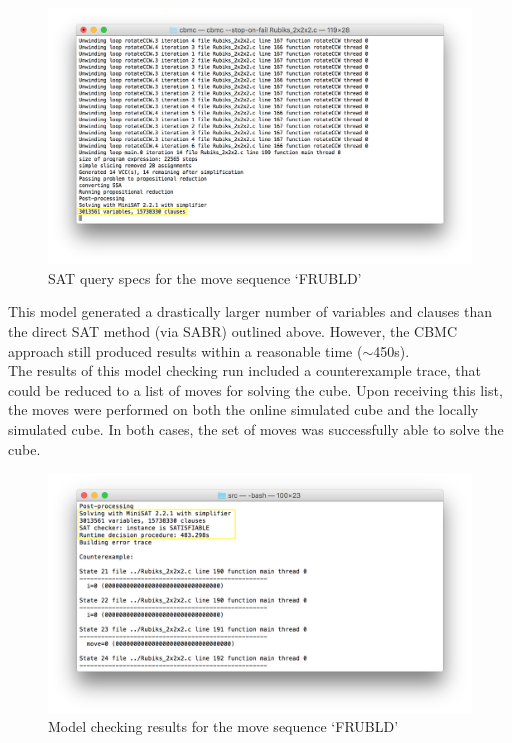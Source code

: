 \documentclass{article}
\begin{document}
\begin{figure}[h]
\includegraphics[width=\textwidth]{pics/2x2x2_SAT_Query_Specs.png}
\caption{SAT query specs for the move sequence `FRUBLD'}
\end{figure}

\noindent This model generated a drastically larger number of variables and clauses than the direct SAT method (via SABR) outlined above. However, the CBMC approach still produced results within a reasonable time ($\sim$450s).\\

\noindent The results of this model checking run included a counterexample trace, that could be reduced to a list of moves for solving the cube. Upon receiving this list, the moves were performed on both the online simulated cube and the locally simulated cube. In both cases, the set of moves was successfully able to solve the cube.

\begin{figure}[h]
\includegraphics[width=\textwidth]{pics/2x2x2_Successful_Solve.png}
\caption{Model checking results for the move sequence `FRUBLD'}
\end{figure}
\end{document}
